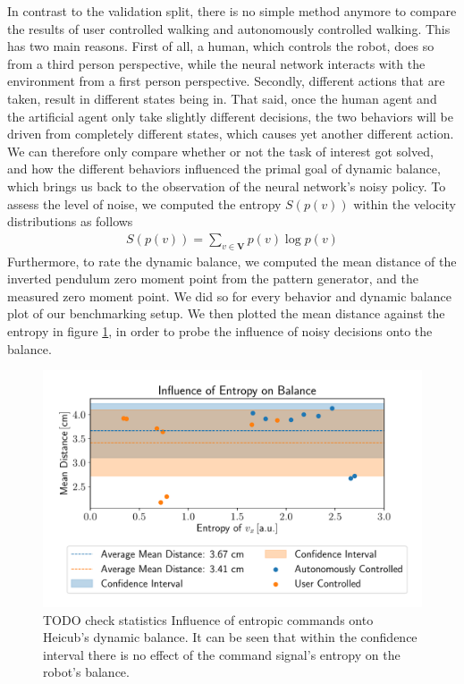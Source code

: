 In contrast to the validation split, there is no simple method anymore to compare the results of user controlled walking and autonomously controlled walking. This has two main reasons. First of all, a human, which controls the robot, does so from a third person perspective, while the neural network interacts with the environment from a first person perspective. Secondly, different actions that are taken, result in different states being in. That said, once the human agent and the artificial agent only take slightly different decisions, the two behaviors will be driven from completely different states, which causes yet another different action. We can therefore only compare whether or not the task of interest got solved, and how the different behaviors influenced the primal goal of dynamic balance, which brings us back to the observation of the neural network's noisy policy. To assess the level of noise, we computed the entropy $S(p(v))$ within the velocity distributions as follows
\begin{align}
	S(p(v)) = \sum_{v\in \bm{V}}p(v)\log p(v)
\end{align}
Furthermore, to rate the dynamic balance, we computed the mean distance of the inverted pendulum zero moment point from the pattern generator, and the measured zero moment point. We did so for every behavior and dynamic balance plot of our benchmarking setup. We then plotted the mean distance against the entropy in figure \ref{fig::424_entropy_balance}, in order to probe the influence of noisy decisions onto the balance.
\begin{figure}[h!]
	\centering
	\includegraphics[scale=.5]{chapters/04_experiments/02_autonomous_walking/entropy_against_balance.pdf}
	\caption{TODO check statistics Influence of entropic commands onto Heicub's dynamic balance. It can be seen that within the confidence interval there is no effect of the command signal's entropy on the robot's balance.}
	\label{fig::424_entropy_balance}
\end{figure}
